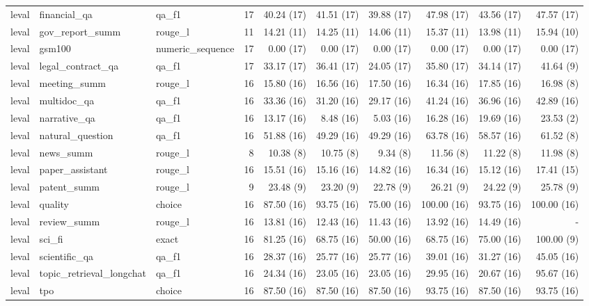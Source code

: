 \begin{landscape}
\begin{longtable}{@{}p{19mm}p{52mm}p{25mm}rrrrrrr@{}}
leval & financial\_qa & qa\_f1 & 17 & 40.24 (17) & 41.51 (17) & 39.88 (17) & 47.98 (17) & 43.56 (17) & 47.57 (17) \\
leval & gov\_report\_summ & rouge\_l & 11 & 14.21 (11) & 14.25 (11) & 14.06 (11) & 15.37 (11) & 13.98 (11) & 15.94 (10) \\
leval & gsm100 & numeric\_sequence & 17 & 0.00 (17) & 0.00 (17) & 0.00 (17) & 0.00 (17) & 0.00 (17) & 0.00 (17) \\
leval & legal\_contract\_qa & qa\_f1 & 17 & 33.17 (17) & 36.41 (17) & 24.05 (17) & 35.80 (17) & 34.14 (17) & 41.64 (9) \\
leval & meeting\_summ & rouge\_l & 16 & 15.80 (16) & 16.56 (16) & 17.50 (16) & 16.34 (16) & 17.85 (16) & 16.98 (8) \\
leval & multidoc\_qa & qa\_f1 & 16 & 33.36 (16) & 31.20 (16) & 29.17 (16) & 41.24 (16) & 36.96 (16) & 42.89 (16) \\
leval & narrative\_qa & qa\_f1 & 16 & 13.17 (16) & 8.48 (16) & 5.03 (16) & 16.28 (16) & 19.69 (16) & 23.53 (2) \\
leval & natural\_question & qa\_f1 & 16 & 51.88 (16) & 49.29 (16) & 49.29 (16) & 63.78 (16) & 58.57 (16) & 61.52 (8) \\
leval & news\_summ & rouge\_l & 8 & 10.38 (8) & 10.75 (8) & 9.34 (8) & 11.56 (8) & 11.22 (8) & 11.98 (8) \\
leval & paper\_assistant & rouge\_l & 16 & 15.51 (16) & 15.16 (16) & 14.82 (16) & 16.34 (16) & 15.12 (16) & 17.41 (15) \\
leval & patent\_summ & rouge\_l & 9 & 23.48 (9) & 23.20 (9) & 22.78 (9) & 26.21 (9) & 24.22 (9) & 25.78 (9) \\
leval & quality & choice & 16 & 87.50 (16) & 93.75 (16) & 75.00 (16) & 100.00 (16) & 93.75 (16) & 100.00 (16) \\
leval & review\_summ & rouge\_l & 16 & 13.81 (16) & 12.43 (16) & 11.43 (16) & 13.92 (16) & 14.49 (16) & - \\
leval & sci\_fi & exact & 16 & 81.25 (16) & 68.75 (16) & 50.00 (16) & 68.75 (16) & 75.00 (16) & 100.00 (9) \\
leval & scientific\_qa & qa\_f1 & 16 & 28.37 (16) & 25.77 (16) & 25.77 (16) & 39.01 (16) & 31.27 (16) & 45.05 (16) \\
leval & topic\_retrieval\_longchat & qa\_f1 & 16 & 24.34 (16) & 23.05 (16) & 23.05 (16) & 29.95 (16) & 20.67 (16) & 95.67 (16) \\
leval & tpo & choice & 16 & 87.50 (16) & 87.50 (16) & 87.50 (16) & 93.75 (16) & 87.50 (16) & 93.75 (16) \\

\end{longtable}
\end{landscape}
